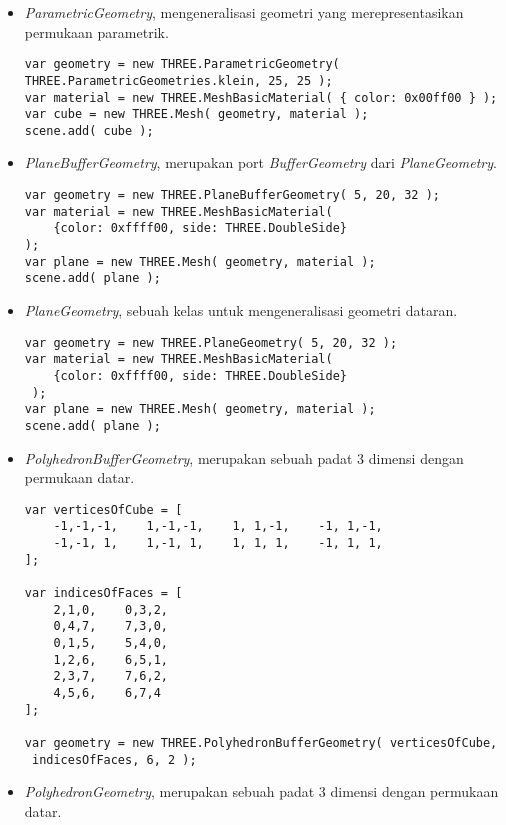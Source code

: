 \begin{itemize}
\begin{itemize}
	\item {\it ParametricGeometry}, mengeneralisasi geometri yang merepresentasikan permukaan parametrik.
	
\begin{lstlisting}
var geometry = new THREE.ParametricGeometry( 
THREE.ParametricGeometries.klein, 25, 25 );
var material = new THREE.MeshBasicMaterial( { color: 0x00ff00 } );
var cube = new THREE.Mesh( geometry, material );
scene.add( cube );
\end{lstlisting}

	\item {\it PlaneBufferGeometry}, merupakan port {\it BufferGeometry} dari {\it PlaneGeometry}.
	
\begin{lstlisting}
var geometry = new THREE.PlaneBufferGeometry( 5, 20, 32 );
var material = new THREE.MeshBasicMaterial( 
	{color: 0xffff00, side: THREE.DoubleSide} 
);
var plane = new THREE.Mesh( geometry, material );
scene.add( plane );
\end{lstlisting}

	\item {\it PlaneGeometry}, sebuah kelas untuk mengeneralisasi geometri dataran.
	
\begin{lstlisting}
var geometry = new THREE.PlaneGeometry( 5, 20, 32 );
var material = new THREE.MeshBasicMaterial( 
	{color: 0xffff00, side: THREE.DoubleSide}
 );
var plane = new THREE.Mesh( geometry, material );
scene.add( plane );
\end{lstlisting}

	\item {\it PolyhedronBufferGeometry}, merupakan sebuah padat 3 dimensi dengan permukaan datar.
	
\begin{lstlisting}
var verticesOfCube = [
    -1,-1,-1,    1,-1,-1,    1, 1,-1,    -1, 1,-1,
    -1,-1, 1,    1,-1, 1,    1, 1, 1,    -1, 1, 1,
];

var indicesOfFaces = [
    2,1,0,    0,3,2,
    0,4,7,    7,3,0,
    0,1,5,    5,4,0,
    1,2,6,    6,5,1,
    2,3,7,    7,6,2,
    4,5,6,    6,7,4
];

var geometry = new THREE.PolyhedronBufferGeometry( verticesOfCube,
 indicesOfFaces, 6, 2 );
\end{lstlisting}

	\item {\it PolyhedronGeometry}, merupakan sebuah padat 3 dimensi dengan permukaan datar.
	

\end{itemize}
\end{itemize}
